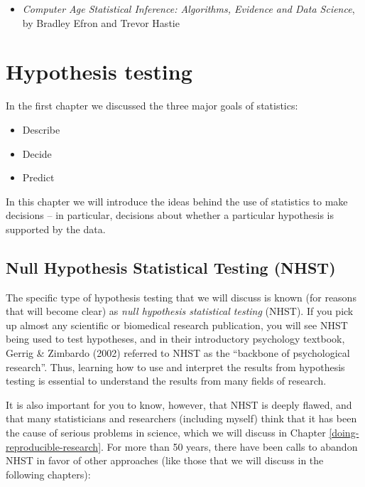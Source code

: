\documentclass[12pt,]{book}
\providecommand{\tightlist}{%
  \setlength{\itemsep}{0pt}\setlength{\parskip}{0pt}}
\theoremstyle{definition}
\theoremstyle{definition}
\theoremstyle{definition}
\theoremstyle{remark}
\begin{document}
\begin{itemize}
\tightlist
\item
  \emph{Computer Age Statistical Inference: Algorithms, Evidence and Data Science}, by Bradley Efron and Trevor Hastie
\end{itemize}

\hypertarget{hypothesis-testing}{%
\chapter{Hypothesis testing}\label{hypothesis-testing}}

In the first chapter we discussed the three major goals of statistics:

\begin{itemize}
\tightlist
\item
  Describe
\item
  Decide
\item
  Predict
\end{itemize}

In this chapter we will introduce the ideas behind the use of statistics to make decisions -- in particular, decisions about whether a particular hypothesis is supported by the data.

\hypertarget{null-hypothesis-statistical-testing-nhst}{%
\section{Null Hypothesis Statistical Testing (NHST)}\label{null-hypothesis-statistical-testing-nhst}}

The specific type of hypothesis testing that we will discuss is known (for reasons that will become clear) as \emph{null hypothesis statistical testing} (NHST). If you pick up almost any scientific or biomedical research publication, you will see NHST being used to test hypotheses, and in their introductory psychology textbook, Gerrig \& Zimbardo (2002) referred to NHST as the ``backbone of psychological research''. Thus, learning how to use and interpret the results from hypothesis testing is essential to understand the results from many fields of research.

It is also important for you to know, however, that NHST is deeply flawed, and that many statisticians and researchers (including myself) think that it has been the cause of serious problems in science, which we will discuss in Chapter \ref{doing-reproducible-research}. For more than 50 years, there have been calls to abandon NHST in favor of other approaches (like those that we will discuss in the following chapters):
\end{document}
